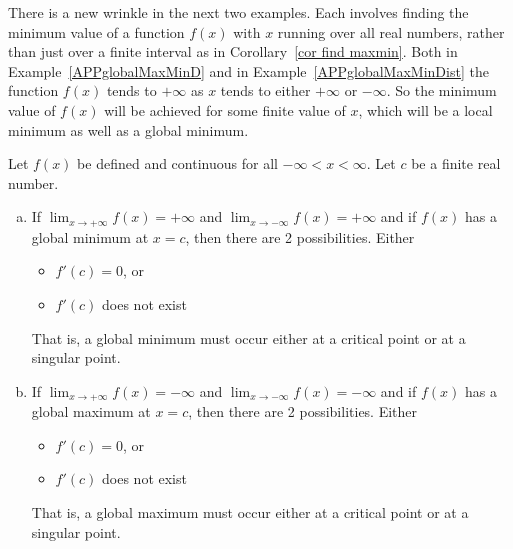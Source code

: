 There is a new wrinkle in the next two examples. Each involves finding the
minimum value of a function $f(x)$ with $x$ running over all real numbers,
rather than just over a finite interval as in Corollary~\ref{cor find maxmin}.
Both in Example~\ref{APPglobalMaxMinD} and in Example~\ref{APPglobalMaxMinDist}
the function $f(x)$ tends to $+\infty$ as $x$ tends to either $+\infty$ or
$-\infty$. So the minimum value of $f(x)$ will be achieved for some finite value
of $x$, which will be a local minimum as well as a global minimum.

\begin{theorem}\label{thm:maxMinOnR}
Let $f(x)$ be defined and continuous for all $-\infty<x<\infty$. Let $c$ be a finite
real number.

\begin{enumerate}[(a)]
\item If $\displaystyle \lim_{x\rightarrow+\infty} f(x)=+\infty$ and
$\displaystyle \lim_{x\rightarrow-\infty} f(x)=+\infty$ and if $f(x)$ has a global
minimum at $x = c$, then there are 2 possibilities. Either
  \begin{itemize}
  \item  $f'(c) = 0$, or
  \item  $f'(c)$ does not exist
  \end{itemize}
That is, a global minimum must occur either at a critical point or at a singular point.

\item If $\displaystyle \lim_{x\rightarrow+\infty} f(x)=-\infty$ and
$\displaystyle \lim_{x\rightarrow-\infty} f(x)=-\infty$ and if $f(x)$ has a global
maximum at $x = c$, then there are 2 possibilities. Either
\begin{itemize}
  \item  $f'(c) = 0$, or
  \item  $f'(c)$ does not exist
\end{itemize}
That is, a global maximum must occur either at a critical point or at a singular point.
\end{enumerate}
\end{theorem}


